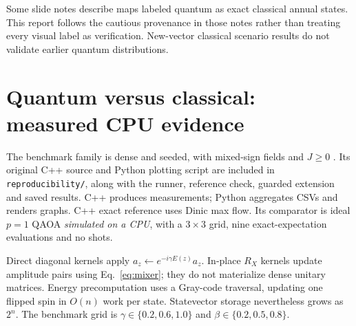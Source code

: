 \documentclass[11pt,letterpaper]{article}
\newcommand{\file}[1]{\nolinkurl{#1}}
\begin{document}
Some slide notes describe maps labeled quantum as exact classical annual states. This report follows the cautious provenance in those notes rather than treating every visual label as verification. New-vector classical scenario results do not validate earlier quantum distributions.
\section{Quantum versus classical: measured CPU evidence}\label{sec:benchmarks}
The benchmark family is dense and seeded, with mixed-sign fields and $J\geq0$ \cite{bench}. Its original C++ source and Python plotting script are included in \file{reproducibility/}, along with the runner, reference check, guarded extension and saved results. C++ produces measurements; Python aggregates CSVs and renders graphs. C++ exact reference uses Dinic max flow. Its comparator is ideal $p=1$ QAOA \emph{simulated on a CPU}, with a $3\times3$ grid, nine exact-expectation evaluations and no shots.

Direct diagonal kernels apply $a_z\leftarrow e^{-i\gamma E(z)}a_z$. In-place $R_X$ kernels update amplitude pairs using Eq.~\eqref{eq:mixer}; they do not materialize dense unitary matrices. Energy precomputation uses a Gray-code traversal, updating one flipped spin in $O(n)$ work per state. Statevector storage nevertheless grows as $2^n$. The benchmark grid is $\gamma\in\{0.2,0.6,1.0\}$ and $\beta\in\{0.2,0.5,0.8\}$.
\end{document}
